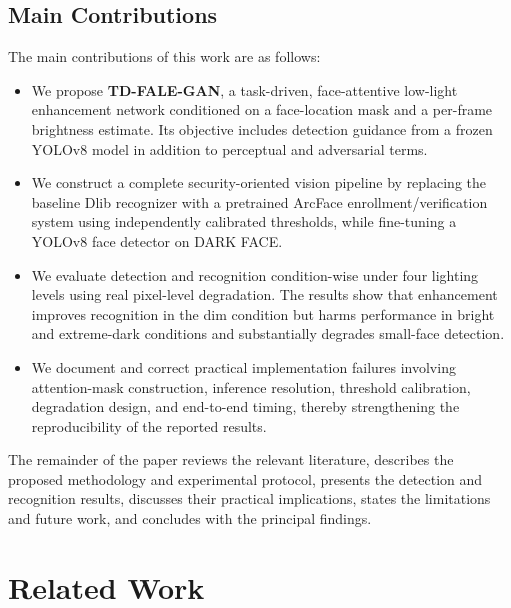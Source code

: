 \documentclass[conference]{IEEEtran}
\begin{document}
\subsection{Main Contributions}
The main contributions of this work are as follows:
\begin{itemize}
    \item We propose \textbf{TD-FALE-GAN}, a task-driven,
    face-attentive low-light enhancement network conditioned on a
    face-location mask and a per-frame brightness estimate. Its
    objective includes detection guidance from a frozen YOLOv8
    model in addition to perceptual and adversarial terms.

    \item We construct a complete security-oriented vision pipeline
    by replacing the baseline Dlib recognizer with a pretrained
    ArcFace enrollment/verification system using independently
    calibrated thresholds, while fine-tuning a YOLOv8 face detector
    on DARK FACE.

    \item We evaluate detection and recognition condition-wise under
    four lighting levels using real pixel-level degradation. The
    results show that enhancement improves recognition in the dim
    condition but harms performance in bright and extreme-dark
    conditions and substantially degrades small-face detection.

    \item We document and correct practical implementation failures
    involving attention-mask construction, inference resolution,
    threshold calibration, degradation design, and end-to-end timing,
    thereby strengthening the reproducibility of the reported results.
\end{itemize}

The remainder of the paper reviews the relevant literature,
describes the proposed methodology and experimental protocol,
presents the detection and recognition results, discusses their
practical implications, states the limitations and future work,
and concludes with the principal findings.

\section{Related Work}
\label{sec:relatedwork}
\end{document}
